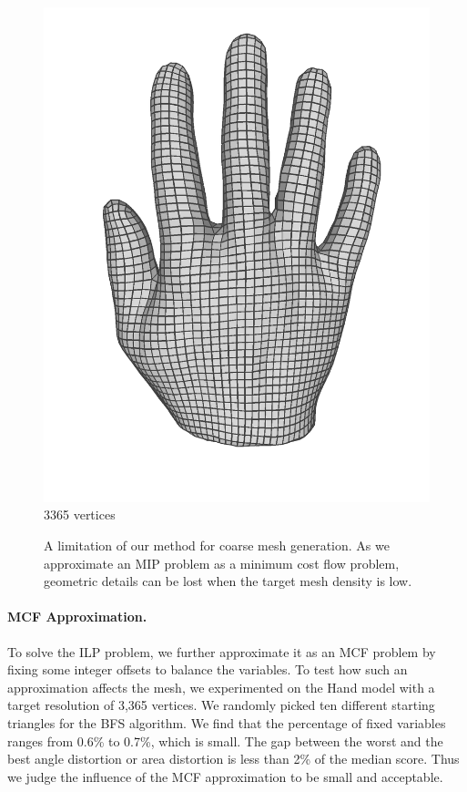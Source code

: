 \begin{figure}
\begin{minipage}{0.24\linewidth}
\includegraphics[width=\linewidth]{quadriflow/evaluation/coarse04.png}
3365 vertices
\end{minipage}
\caption{A limitation of our method for coarse mesh generation. As we approximate an MIP problem as a minimum cost flow problem, geometric details can be lost when the target mesh density is low.}
\label{fig:quad-coarse}
\end{figure}

\paragraph*{MCF Approximation.} To solve the ILP problem, we further approximate it as an MCF problem by fixing some integer offsets to balance the variables.  To test how such an approximation affects the mesh, we experimented on the Hand model with a target resolution of 3,365 vertices. We randomly picked ten different starting triangles for the BFS algorithm.  We find that the percentage of fixed variables ranges from 0.6\% to 0.7\%, which is small. The gap between the worst and the best angle distortion or area distortion is less than 2\% of the median score. Thus we judge the influence of the MCF approximation to be small and acceptable.

